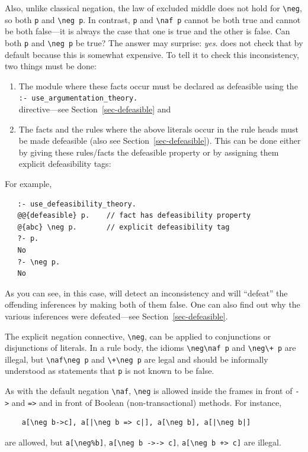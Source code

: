 \documentclass[11pt]{article}
\newcommand{\ERGO}{\mbox{\smaller{\ensuremath{\cal{E}}\smaller{{\sc{RGO}}}}}\xspace}
\newcommand{\FLSYSTEM}{\ERGO}
\newcommand{\bs}{\textbackslash}
\newcommand{\PLGNAF}{\mbox{\texttt{\bs}+}\xspace}
\newcommand{\RULELOGNAF}{{\texttt{{\bs}naf}}\xspace}
\newcommand{\RULELOGNEG}{{\texttt{{\bs}neg}}\xspace}
\begin{document}
Also, unlike classical negation, the law of excluded middle does not hold
for {\tt \RULELOGNEG}, so both \texttt{p} and \texttt{\RULELOGNEG p}.  In
contrast, \texttt{p} and \texttt{\RULELOGNAF p} cannot be both true and
cannot be both false---it is always the case that one is true and the other
is false. Can both \texttt{p} and \texttt{\RULELOGNEG p} be true?   
The answer may surprise: \emph{yes}. \FLSYSTEM does not check that by
default because this is somewhat expensive.
To tell it to check this inconsistency, two things must be done:
\begin{enumerate}
\item  The module where these facts occur must be declared as defeasible
  using the\\
  \texttt{:- use\_argumentation\_theory.}\\
  directive---see
  Section~\ref{sec-defeasible} and
\item The facts and the rules where the above literals occur in the rule
  heads must be made
  defeasible (also see Section~\ref{sec-defeasible}).
  This can be done either by giving these rules/facts the defeasible
  property or by assigning them explicit defeasibility tags:
\end{enumerate}
For example,
\begin{verbatim}
   :- use_defeasibility_theory.
   @@{defeasible} p.    // fact has defeasibility property
   @{abc} \neg p.       // explicit defeasibility tag
   ?- p.
   No
   ?- \neg p.
   No
\end{verbatim}
As you can see, in this case, \FLSYSTEM will detect an inconsistency and
will ``defeat'' the offending inferences by making both of them false. One can also find
out why the various inferences were defeated---see
Section~\ref{sec-defeasible}.

The explicit negation connective, {\tt \RULELOGNEG}, can be applied to
conjunctions or disjunctions of literals.
In a rule body, the idioms {\tt \RULELOGNEG \RULELOGNAF p} and {\tt \RULELOGNEG \PLGNAF p} are
illegal, but {\tt \RULELOGNAF \RULELOGNEG p} and {\tt \PLGNAF \RULELOGNEG p} are legal and should be
informally understood as statements that {\tt p} is not known to be false. 

As with the default negation \RULELOGNAF, {\tt \RULELOGNEG} is allowed inside the
frames 
in front of {\tt ->} and {\tt =>} and in front of
Boolean (non-transactional) methods. For instance,
\begin{verbatim}
    a[\neg b->c], a[|\neg b => c|], a[\neg b], a[|\neg b|]
\end{verbatim}
are allowed, but {\tt a[\RULELOGNEG \%b]}, {\tt a[\RULELOGNEG b ->-> c]}, {\tt a[\RULELOGNEG b
  +> c]} are illegal.  
\end{document}
